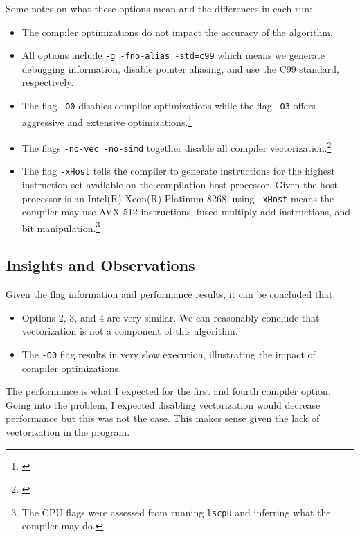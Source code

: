 \documentclass{article}
\newcommand{\MYhref}[3][blue]{\href{#2}{\color{#1}{#3}}}%
\begin{document}
Some notes on what these options mean and the differences in each run:
\begin{itemize}
    \item The compiler optimizations do not impact the accuracy of the algorithm.
    \item All options include \texttt{-g -fno-alias -std=c99} which means we generate 
    debugging information, disable pointer aliasing, and use the C99 standard, respectively.
    \item The flag \texttt{-O0} disables compilor optimizations while the flag \texttt{-O3} offers aggressive and extensive optimizations.\footnote{\MYhref{https://www.intel.com/content/www/us/en/docs/cpp-compiler/developer-guide-reference/2021-8/o-001.html}{Optimizations Compiler Documentation.}}
    \item The flags \texttt{-no-vec -no-simd} together disable all compiler vectorization.\footnote{\MYhref{https://www.intel.com/content/www/us/en/docs/cpp-compiler/developer-guide-reference/2021-8/simd-qsimd.html}{SIMD Compiler Documentation.}}
    \item The flag \texttt{-xHost} tells the compiler to generate instructions for the highest instruction set available on the compilation host processor. Given the host processor is an Intel(R) Xeon(R) Platinum 8268, using \texttt{-xHost} 
    means the compiler may use AVX-512 instructions, fused multiply add instructions, and bit manipulation.\footnote{\MYhref{https://www.intel.com/content/www/us/en/docs/cpp-compiler/developer-guide-reference/2021-8/xhost-qxhost.html}{xHost Compiler Documentation.} The CPU flags were assessed from running \texttt{lscpu} and inferring what the compiler may do.}
\end{itemize}
\subsection*{Insights and Observations}
Given the flag information and performance results, it can be concluded that:
\begin{itemize}
    \item Options 2, 3, and 4 are very similar. We can reasonably conclude that vectorization is not a component of this algorithm. 
    \item The \texttt{-O0} flag results in very slow execution, illustrating the impact of compiler optimizations.
\end{itemize}
The performance is what I expected for the first and fourth compiler option. Going into the problem, I expected disabling vectorization 
would decrease performance but this was not the case. This makes sense given the lack of vectorization in the program.
\end{document}
